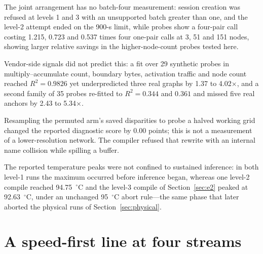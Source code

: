 \documentclass[sigconf,review,anonymous]{acmart}
\begin{document}
The joint arrangement has no batch-four measurement: session creation was refused at levels 1 and 3 with an unsupported batch greater than one, and the level-2 attempt ended on the 900-s limit, while probes show a four-pair call costing 1.215, 0.723 and 0.537 times four one-pair calls at 3, 51 and 151 nodes, showing larger relative savings in the higher-node-count probes tested here.

Vendor-side signals did not predict this: a fit over 29 synthetic probes in multiply--accumulate count, boundary bytes, activation traffic and node count reached $R^2 = 0.9826$ yet underpredicted three real graphs by 1.37 to 4.02$\times$, and a second family of 35 probes re-fitted to $R^2 = 0.344$ and $0.361$ and missed five real anchors by 2.43 to 5.34$\times$.

Resampling the permuted arm's saved disparities to probe a halved working grid changed the reported diagnostic score by 0.00 points; this is not a measurement of a lower-resolution network. The compiler refused that rewrite with an internal name collision while spilling a buffer.

The reported temperature peaks were not confined to sustained inference: in both level-1 runs the maximum occurred before inference began, whereas one level-2 compile reached 94.75~$^{\circ}$C and the level-3 compile of Section~\ref{sec:e2} peaked at 92.63~$^{\circ}$C, under an unchanged 95~$^{\circ}$C abort rule---the same phase that later aborted the physical runs of Section~\ref{sec:physical}.

\section{A speed-first line at four streams}
\label{sec:speedline}
\end{document}
